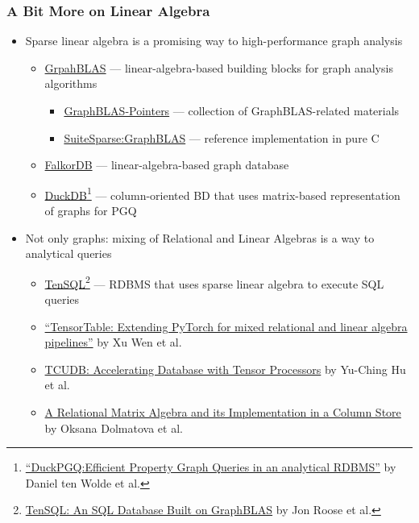 \documentclass[xcolor=table,aspectratio=169]{beamer}
\begin{document}
\setcounter{footnote}{7}

\begin{frame}[fragile]
  \frametitle{A Bit More on Linear Algebra}
    \begin{itemize}
    \item Sparse linear algebra is a promising way to high-performance graph analysis
    \begin{itemize}
      \item \href{https://graphblas.org/}{GrpahBLAS}  --- linear-algebra-based building blocks for graph analysis algorithms
      \begin{itemize}
        \item \href{https://github.com/GraphBLAS/GraphBLAS-Pointers}{GraphBLAS-Pointers} --- collection of GraphBLAS-related materials
        \item \href{https://github.com/DrTimothyAldenDavis/GraphBLAS}{SuiteSparse:GraphBLAS} --- reference implementation in pure C
      \end{itemize}
      \item \href{https://github.com/FalkorDB/falkordb}{FalkorDB} --- linear-algebra-based graph database
      \item \href{https://duckdb.org/}{DuckDB}\footnote{\href{https://www.cidrdb.org/cidr2023/papers/p66-wolde.pdf}{``DuckPGQ:Efficient Property Graph Queries in an analytical RDBMS''} by Daniel ten Wolde et al.} --- column-oriented BD that uses matrix-based representation of graphs for PGQ
    \end{itemize}
    \pause
    \item Not only graphs: mixing of Relational and Linear Algebras is a way to analytical queries
    \begin{itemize}
      \item \href{https://github.com/sandialabs/TenSQL}{TenSQL}\footnote{\href{https://ieeexplore.ieee.org/abstract/document/10363601}{TenSQL: An SQL Database Built on GraphBLAS} by Jon Roose et al.} --- RDBMS that uses sparse linear algebra to execute SQL queries
      \item \href{https://www.sciencedirect.com/science/article/pii/S2772485924000139}{``TensorTable: Extending PyTorch for mixed relational and linear algebra pipelines''} by Xu Wen  et al.
      \item \href{https://dl.acm.org/doi/abs/10.1145/3514221.3517869}{TCUDB: Accelerating Database with Tensor Processors} by Yu-Ching Hu  et al. %
      \item \href{https://dl.acm.org/doi/abs/10.1145/3318464.3389747}{A Relational Matrix Algebra and its Implementation in a Column Store}  by Oksana Dolmatova  et al. %
    \end{itemize}
  \end{itemize}
\end{frame}
\end{document}
